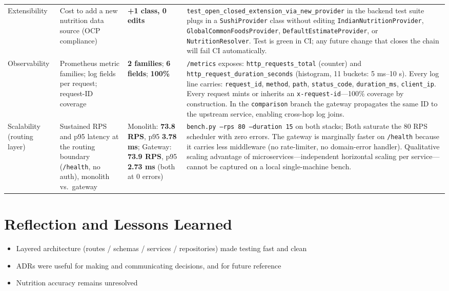 \documentclass[11pt]{article}
\begin{document}
\begin{longtable}{p{2.6cm} p{3.0cm} p{3.0cm} p{7.4cm}}
  Extensibility
    & Cost to add a new nutrition data source (OCP compliance)
    & \textbf{+1 class, 0 edits}
    & \texttt{test\_open\_closed\_extension\_via\_new\_provider} in the backend test suite
      plugs in a \texttt{SushiProvider} class without editing \texttt{IndianNutritionProvider},
      \texttt{GlobalCommonFoodsProvider}, \texttt{DefaultEstimateProvider}, or
      \texttt{NutritionResolver}. Test is green in CI; any future change that closes the
      chain will fail CI automatically. \\

  Observability
    & Prometheus metric families; log fields per request; request-ID coverage
    & \textbf{2 families}; \textbf{6 fields}; \textbf{100\%}
    & \texttt{/metrics} exposes: \texttt{http\_requests\_total} (counter) and
      \texttt{http\_request\_duration\_seconds} (histogram, 11 buckets: 5 ms--10 s).
      Every log line carries: \texttt{request\_id}, \texttt{method}, \texttt{path},
      \texttt{status\_code}, \texttt{duration\_ms}, \texttt{client\_ip}.
      Every request mints or inherits an \texttt{x-request-id}---100\% coverage
      by construction. In the \texttt{comparison} branch the gateway propagates the same ID
      to the upstream service, enabling cross-hop log joins. \\

  Scalability (routing layer)
    & Sustained RPS and p95 latency at the routing boundary (\texttt{/health}, no auth),
      monolith vs.\ gateway
    & Monolith: \textbf{73.8 RPS}, p95 \textbf{3.78 ms}; Gateway: \textbf{73.9 RPS},
      p95 \textbf{2.73 ms} (both at 0 errors)
    & \texttt{bench.py --rps 80 --duration 15} on both stacks; Both saturate the 80 RPS scheduler with zero errors.
      The gateway is marginally faster on \texttt{/health} because it carries less middleware
      (no rate-limiter, no domain-error handler). Qualitative scaling advantage of
      microservices---independent horizontal scaling per service---cannot be captured on a
      local single-machine bench. \\

  \bottomrule
\end{longtable}

\section{Reflection and Lessons Learned}

\begin{itemize}
  \item Layered architecture (routes / schemas / services / repositories) made testing fast and clean
  \item ADRs were useful for making and communicating decisions, and for future reference
  \item Nutrition accuracy remains unresolved
\end{itemize}
\end{document}

